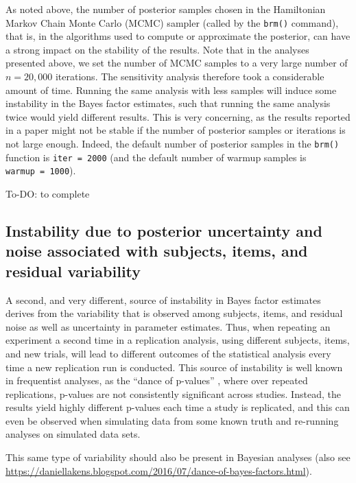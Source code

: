 \documentclass[12pt,]{krantz}
\theoremstyle{definition}
\theoremstyle{definition}
\theoremstyle{definition}
\theoremstyle{remark}
\begin{document}
As noted above, the number of posterior samples chosen in the
Hamiltonian Markov Chain Monte Carlo (MCMC) sampler (called by the
\texttt{brm()} command), that is, in the algorithms used to compute or
approximate the posterior, can have a strong impact on the stability of
the results. Note that in the analyses presented above, we set the
number of MCMC samples to a very large number of \(n = 20,000\)
iterations. The sensitivity analysis therefore took a considerable
amount of time. Running the same analysis with less samples will induce
some instability in the Bayes factor estimates, such that running the
same analysis twice would yield different results. This is very
concerning, as the results reported in a paper might not be stable if
the number of posterior samples or iterations is not large enough.
Indeed, the default number of posterior samples in the \texttt{brm()}
function is \texttt{iter\ =\ 2000} (and the default number of warmup
samples is \texttt{warmup\ =\ 1000}).

To-DO: to complete

\subsection{Instability due to posterior uncertainty and noise
associated with subjects, items, and residual
variability}\label{instability-due-to-posterior-uncertainty-and-noise-associated-with-subjects-items-and-residual-variability}

A second, and very different, source of instability in Bayes factor
estimates derives from the variability that is observed among subjects,
items, and residual noise as well as uncertainty in parameter estimates.
Thus, when repeating an experiment a second time in a replication
analysis, using different subjects, items, and new trials, will lead to
different outcomes of the statistical analysis every time a new
replication run is conducted. This source of instability is well known
in frequentist analyses, as the ``dance of p-values''
\citep{cumming2014new}, where over repeated replications, p-values are
not consistently significant across studies. Instead, the results yield
highly different p-values each time a study is replicated, and this can
even be observed when simulating data from some known truth and
re-running analyses on simulated data sets.

This same type of variability should also be present in Bayesian
analyses (also see
\url{https://daniellakens.blogspot.com/2016/07/dance-of-bayes-factors.html}).
\end{document}
